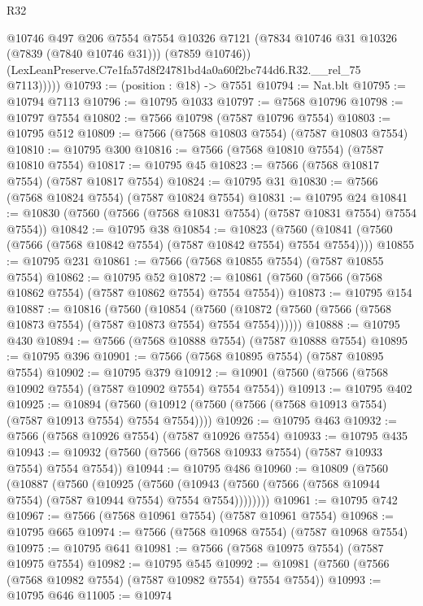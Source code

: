 \begin{lexlean}{R32}
\begin{coremodule}
              @10746
              @497
              @206
              @7554
              @7554
              @10326
              @7121
              (@7834 @10746 @31 @10326 (@7839 (@7840 @10746 @31)))
              (@7859 @10746))
            (LexLeanPreserve.C7e1fa57d8f24781bd4a0a60f2bc744d6.R32.__rel_75 @7113)))))
@10793 := (position : @18) -> @7551
@10794 := Nat.blt
@10795 := @10794 @7113
@10796 := @10795 @1033
@10797 := @7568 @10796
@10798 := @10797 @7554
@10802 := @7566 @10798 (@7587 @10796 @7554)
@10803 := @10795 @512
@10809 := @7566 (@7568 @10803 @7554) (@7587 @10803 @7554)
@10810 := @10795 @300
@10816 := @7566 (@7568 @10810 @7554) (@7587 @10810 @7554)
@10817 := @10795 @45
@10823 := @7566 (@7568 @10817 @7554) (@7587 @10817 @7554)
@10824 := @10795 @31
@10830 := @7566 (@7568 @10824 @7554) (@7587 @10824 @7554)
@10831 := @10795 @24
@10841 := @10830 (@7560 (@7566 (@7568 @10831 @7554) (@7587 @10831 @7554) @7554 @7554))
@10842 := @10795 @38
@10854 := @10823
    (@7560 (@10841 (@7560 (@7566 (@7568 @10842 @7554) (@7587 @10842 @7554) @7554 @7554))))
@10855 := @10795 @231
@10861 := @7566 (@7568 @10855 @7554) (@7587 @10855 @7554)
@10862 := @10795 @52
@10872 := @10861 (@7560 (@7566 (@7568 @10862 @7554) (@7587 @10862 @7554) @7554 @7554))
@10873 := @10795 @154
@10887 := @10816
    (@7560
      (@10854
        (@7560 (@10872 (@7560 (@7566 (@7568 @10873 @7554) (@7587 @10873 @7554) @7554 @7554))))))
@10888 := @10795 @430
@10894 := @7566 (@7568 @10888 @7554) (@7587 @10888 @7554)
@10895 := @10795 @396
@10901 := @7566 (@7568 @10895 @7554) (@7587 @10895 @7554)
@10902 := @10795 @379
@10912 := @10901 (@7560 (@7566 (@7568 @10902 @7554) (@7587 @10902 @7554) @7554 @7554))
@10913 := @10795 @402
@10925 := @10894
    (@7560 (@10912 (@7560 (@7566 (@7568 @10913 @7554) (@7587 @10913 @7554) @7554 @7554))))
@10926 := @10795 @463
@10932 := @7566 (@7568 @10926 @7554) (@7587 @10926 @7554)
@10933 := @10795 @435
@10943 := @10932 (@7560 (@7566 (@7568 @10933 @7554) (@7587 @10933 @7554) @7554 @7554))
@10944 := @10795 @486
@10960 := @10809
    (@7560
      (@10887
        (@7560
          (@10925
            (@7560
              (@10943 (@7560 (@7566 (@7568 @10944 @7554) (@7587 @10944 @7554) @7554 @7554))))))))
@10961 := @10795 @742
@10967 := @7566 (@7568 @10961 @7554) (@7587 @10961 @7554)
@10968 := @10795 @665
@10974 := @7566 (@7568 @10968 @7554) (@7587 @10968 @7554)
@10975 := @10795 @641
@10981 := @7566 (@7568 @10975 @7554) (@7587 @10975 @7554)
@10982 := @10795 @545
@10992 := @10981 (@7560 (@7566 (@7568 @10982 @7554) (@7587 @10982 @7554) @7554 @7554))
@10993 := @10795 @646
@11005 := @10974

\end{coremodule}
\end{lexlean}
